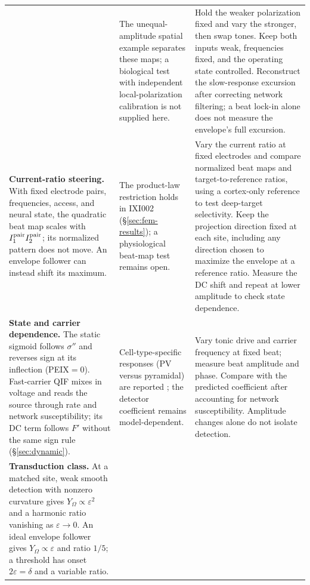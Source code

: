\documentclass[11pt,a4paper]{article}
\newcommand{\Sig}{\sigma}
\providecommand{\DIFaddtex}[1]{{\protect\color{blue} \sf #1}} %
\providecommand{\DIFadd}[1]{\texorpdfstring{\DIFaddtex{#1}}{#1}} %
\begin{document}
\begin{longtable}{@{}>{\raggedright\arraybackslash}p{}
 >{\raggedright\arraybackslash}p{}
 >{\raggedright\arraybackslash}p{}@{}}
{quadratic modulation excursion follows $2|\varepsilon_1\varepsilon_2|$;
an ideal envelope follower tracks $2\min(|\varepsilon_1|,|\varepsilon_2|)$
(Eq.~\eqref{eq:reweight}, Table~\ref{tab:transduction-maps}).
}& \DIFadd{The unequal-amplitude spatial example separates these maps; a biological test
with independent local-polarization calibration is not supplied here.
}& \DIFadd{Hold the weaker polarization fixed and vary the stronger, then swap tones.
Keep both inputs weak, frequencies fixed, and the operating state controlled.
Reconstruct the slow-response excursion after correcting network filtering;
a beat lock-in alone does not measure the envelope's full excursion. }\\[4pt]
\DIFadd{\textbf{Current-ratio steering.} With fixed electrode pairs, frequencies,
access, and neural state, the quadratic beat map scales with
$I_1^{\rm pair}I_2^{\rm pair}$; its normalized pattern does not move.
An envelope follower can instead shift its maximum.
}& \DIFadd{The product-law restriction \cite{cassara2025part2} holds in IXI002
(\S\ref{sec:fem-results}); a physiological beat-map test remains open.
}& \DIFadd{Vary the current ratio at fixed electrodes and compare normalized beat maps
and target-to-reference ratios, using a cortex-only reference to test deep-target
selectivity. Keep the projection direction fixed at each site,
including any direction chosen to maximize the envelope at a reference ratio.
Measure the DC shift and repeat at lower amplitude to check state dependence.
 }\\[4pt]
\DIFadd{\textbf{State and carrier dependence.} The static sigmoid follows $\Sig''$ and
reverses sign at its inflection (PEIX$=0$). Fast-carrier QIF mixes in voltage and
reads the source through rate and network susceptibility; its DC term follows
$F'$ without the same sign rule (\S\ref{sec:dynamic}).
}& \DIFadd{Cell-type-specific responses (PV versus pyramidal) are reported
\cite{caldas2024}; the detector coefficient remains model-dependent.
}& \DIFadd{Vary tonic drive and carrier frequency at fixed beat; measure beat amplitude
and phase. Compare with the predicted coefficient after accounting for network
susceptibility. Amplitude changes alone do not isolate detection. }\\[4pt]
\DIFadd{\textbf{Transduction class.} At a matched site, weak smooth detection with nonzero
curvature gives $Y_\Omega\propto\varepsilon^2$ and a harmonic ratio vanishing as
$\varepsilon\to0$. An ideal envelope follower gives $Y_\Omega\propto\varepsilon$
and ratio $1/5$; a threshold has onset $2\varepsilon=\delta$ and a variable ratio.
}
\end{longtable}
\end{document}
